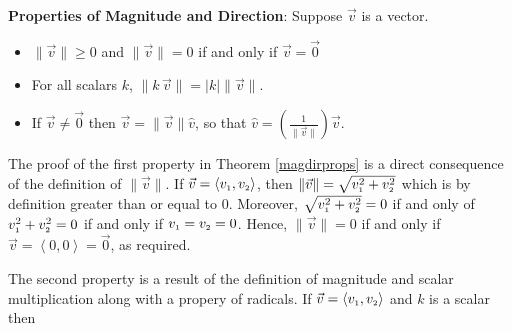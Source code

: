 \colorbox{ResultColor}{\bbm
\begin{thm}  \label{magdirprops}  \textbf{Properties of Magnitude and Direction}: Suppose $\vec{v}$ is a vector.  

\begin{itemize}

\item $\| \vec{v} \| \geq 0$ and $\| \vec{v} \| = 0$ if and only if $\vec{v} = \vec{0}$

\item  For all scalars $k$,  $\| k \, \vec{v} \| = |k| \| \vec{v} \|$.

\item  If $\vec{v} \neq \vec{0}$ then $\vec{v} = \| \vec{v} \| \hat{v}$, so that $\hat{v} = \left(\frac{1}{\|\vec{v}\|}\right) \vec{v}$.

\end{itemize}

\end{thm}

\ebm}

\smallskip

The proof of the first property in Theorem \ref{magdirprops} is a direct consequence of the definition of $\| \vec{v} \|$.  If $\vec{v}  = \left< v_{\mbox{\tiny $1$}} ,v_{\mbox{\tiny $2$}}\right>$, then $\| \vec{v} \| = \sqrt{v_{\mbox{\tiny $1$}}^2 + v_{\mbox{\tiny $2$}}^2}$ which is by definition greater than or equal to $0$.  Moreover, $\sqrt{v_{\mbox{\tiny $1$}}^2 + v_{\mbox{\tiny $2$}}^2} = 0$ if and only of $v_{\mbox{\tiny $1$}}^2 + v_{\mbox{\tiny $2$}}^2 = 0$ if and only if $v_{\mbox{\tiny $1$}} = v_{\mbox{\tiny $2$}} = 0$.  Hence, $\| \vec{v} \| = 0$ if and only if $\vec{v} = \left<0,0\right> =  \vec{0}$, as required.

\smallskip

The second property is a result of the definition of magnitude and scalar multiplication along with a propery of radicals. If $\vec{v} = \left< v_{\mbox{\tiny $1$}} ,v_{\mbox{\tiny $2$}}\right>$ and $k$ is a scalar then 

